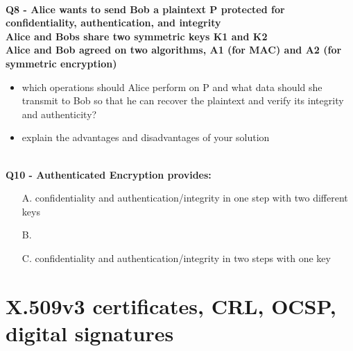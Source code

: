 \textbf{\\Q8 - Alice wants to send Bob a plaintext P protected for confidentiality, authentication, and integrity \\
Alice and Bobs share two symmetric keys K1 and K2 \\
Alice and Bob agreed on two algorithms, A1 (for MAC) and A2 (for symmetric encryption)}
\begin{itemize}
    \item which operations should Alice perform on P and what data
    should she transmit to Bob so that he can recover the plaintext
    and verify its integrity and authenticity?
    \item explain the advantages and disadvantages of your solution 
\end{itemize}
\textbf{\\Q10  - Authenticated Encryption provides:}
\begin{enumerate}
    \item[A.] confidentiality and authentication/integrity in one step with two different keys
    \item[B.] 
    \item[C.] confidentiality and authentication/integrity in two steps with one key
\end{enumerate}




\section{X.509v3 certificates, CRL, OCSP, digital signatures}

